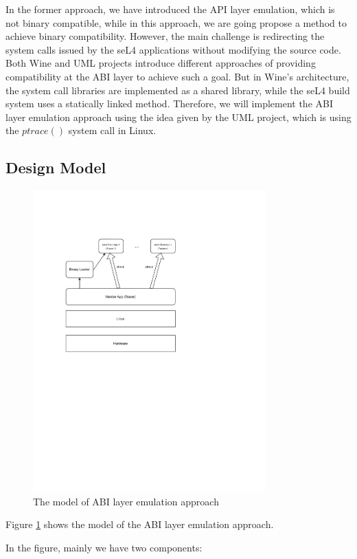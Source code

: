 
In the former approach, we have introduced the API layer emulation, which is not binary compatible, while in this approach, we are going propose a method to achieve binary compatibility. However, the main challenge is redirecting the system calls issued by the seL4 applications without modifying the source code. Both Wine and UML projects introduce different approaches of providing compatibility at the ABI layer to achieve such a goal. But in Wine's architecture, the system call libraries are implemented as a shared library, while the seL4 build system uses a statically linked method. Therefore, we will implement the ABI layer emulation approach using the idea given by the UML project, which is using the $ptrace()$ system call in Linux.

\subsection{Design Model} 

\begin{figure}[h]
    \centering
    \includegraphics[clip, trim=0.5cm 16cm 8cm 0.5cm, width=0.8\textwidth, height=0.8\textwidth]{ch3/model2-v2.pdf}
    \caption{The model of ABI layer emulation approach}
    \label{fig:mabi}
\end{figure}

Figure \ref{fig:mabi} shows the model of the ABI layer emulation approach.

In the figure, mainly we have two components:

